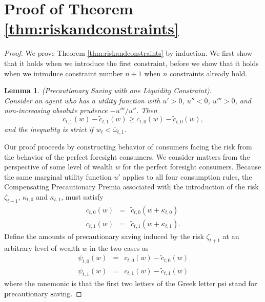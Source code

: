 \documentclass[titlepage]{\econtex}
\providecommand{\wAlt}{\omega}
\newtheorem{lemma}{Lemma}
\begin{document}
\section{Proof of Theorem \ref{thm:riskandconstraints}}\label{app:riskandconstraints}

\begin{proof}
We prove Theorem \ref{thm:riskandconstraints} by induction. We first show that it holds when we introduce the first constraint, before we show that it holds when we introduce constraint number $n+1$ when $n$ constraints already hold. 

\begin{lemma}(Precautionary Saving with one Liquidity Constraint). \label{lem:pslc}\\
	Consider an agent who has a utility function with $u'> 0$, $u''< 0$, $u''' > 0$, and non-increasing absolute prudence $-u'''/u''$. Then 
	\begin{equation}
	c_{t,1}(w) - \tilde{c}_{t,1}(w) \geq c_{t,0}(w)-\tilde{c}_{t,0}(w), \label{eq:ineq2}
	\end{equation}
	and the inequality is strict if $w_t < \bar{\wAlt}_{t,1}$.
\end{lemma}


Our proof proceeds by constructing behavior of consumers facing the
risk from the behavior of the perfect foresight consumers.  We consider matters from the perspective of some level of wealth ${w}$ for the perfect foresight consumers.  Because the same marginal utility function $u'$ applies to all four consumption rules, the Compensating Precautionary Premia associated with the introduction of the risk $\zeta_{t+1}$, $\kappa_{t,0}$ and $\kappa_{t,1}$, must satisfy
\begin{eqnarray}
 c_{t,0}({w}) & = & \tilde{c}_{t,0}({w}+\kappa_{t,0}) \label{eq:hateqtildehat2}
\\ c_{t,1}({w}) & = & \tilde{c}_{t,1}({w}+\kappa_{t,1}). \label{eq:hateqtildehat}\end{eqnarray}
Define the amounts of precautionary saving induced by the risk $\zeta_{t+1}$ at an arbitrary level of wealth $w$ in the two cases as
\begin{eqnarray}
  \psi_{t,0}(w) & = & c_{t,0}(w)-\tilde{c}_{t,0}(w)
\\   \psi_{t,1}(w) & = & c_{t,1}(w)-\tilde{c}_{t,1}(w)
\end{eqnarray}
where the mnemonic is that the first two letters of the Greek letter psi stand
for {\bf p}recautionary {\bf s}aving.


\end{proof}
\end{document}
